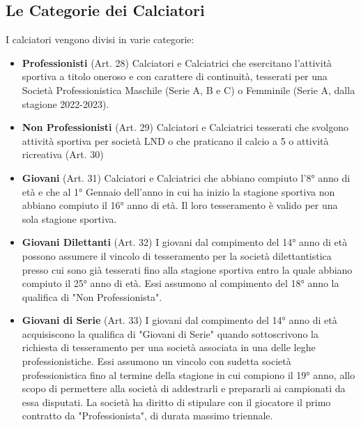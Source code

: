 \documentclass[../uefaC.tex]{subfiles}
\begin{document}
\subsection{Le Categorie dei Calciatori}
I calciatori vengono divisi in varie categorie:
\begin{itemize}
    \item\textbf{Professionisti} (Art. 28) Calciatori e Calciatrici che esercitano l'attività sportiva a titolo oneroso e con carattere di continuità, tesserati per una Società Professionistica Maschile (Serie A, B e C) o Femminile (Serie A, dalla stagione 2022-2023).
    \item\textbf{Non Professionisti} (Art. 29) Calciatori e Calciatrici tesserati che svolgono attività sportiva per società LND o che praticano il calcio a 5 o attività ricreativa (Art. 30)
    \item\textbf{Giovani} (Art. 31) Calciatori e Calciatrici che abbiano compiuto l'8° anno di età e che al 1° Gennaio dell'anno in cui ha inizio la stagione sportiva non abbiano compiuto il 16° anno di età. Il loro tesseramento è valido per una sola stagione sportiva.
    \item\textbf{Giovani Dilettanti} (Art. 32) I giovani dal compimento del 14° anno di età possono assumere il vincolo di tesseramento per la società dilettantistica presso cui sono già tesserati fino alla stagione sportiva entro la quale abbiano compiuto il 25° anno di età. Essi assumono al compimento del 18° anno la qualifica di "Non Professionista".
    \item\textbf{Giovani di Serie} (Art. 33) I giovani dal compimento del 14° anno di età acquisiscono la qualifica di "Giovani di Serie" quando sottoscrivono la richiesta di tesseramento per una società associata in una delle leghe professionistiche. Essi assumono un vincolo con sudetta società professionistica fino al termine della stagione in cui compiono il 19° anno, allo scopo di permettere alla società di addestrarli e prepararli ai campionati da essa disputati. La società ha diritto di stipulare con il giocatore il primo contratto da "Professionista", di durata massimo triennale.
\end{itemize}
\end{document}
